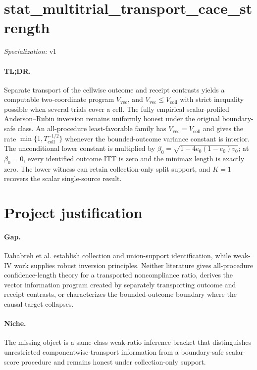 \documentclass{article}
\begin{document}
\sloppy

\section*{stat\_\allowbreak{}multitrial\_\allowbreak{}transport\_\allowbreak{}cace\_\allowbreak{}strength}

\noindent\textit{Specialization:} v1\par

\paragraph{TL;DR.} Separate transport of the cellwise outcome and receipt contrasts yields a computable two-coordinate program \(V_{\mathrm{vec}}\), and \(V_{\mathrm{vec}}\le V_{\mathrm{coll}}\) with strict inequality possible when several trials cover a cell. The fully empirical scalar-profiled Anderson--Rubin inversion remains uniformly honest under the original boundary-safe class. An all-procedure least-favorable family has \(V_{\mathrm{vec}}=V_{\mathrm{coll}}\) and gives the rate \(\min\{1,T_{\mathrm{coll}}^{-1/2}\}\) whenever the bounded-outcome variance constant is interior. The unconditional lower constant is multiplied by \(\beta_0=\sqrt{1-4e_0(1-e_0)v_0}\); at \(\beta_0=0\), every identified outcome ITT is zero and the minimax length is exactly zero. The lower witness can retain collection-only split support, and \(K=1\) recovers the scalar single-source result.

\section{Project justification}

\paragraph{Gap.} Dahabreh et al. establish collection and union-support identification, while weak-IV work supplies robust inversion principles. Neither literature gives all-procedure confidence-length theory for a transported noncompliance ratio, derives the vector information program created by separately transporting outcome and receipt contrasts, or characterizes the bounded-outcome boundary where the causal target collapses.

\paragraph{Niche.} The missing object is a same-class weak-ratio inference bracket that distinguishes unrestricted componentwise-transport information from a boundary-safe scalar-score procedure and remains honest under collection-only support.
\end{document}
